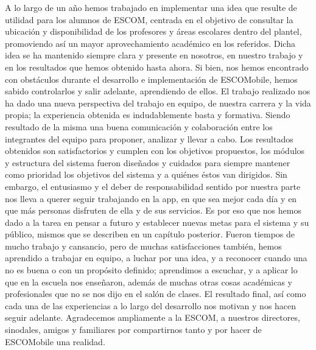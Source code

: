 \noindent
A lo largo de un año hemos trabajado en implementar una idea que resulte de utilidad para los alumnos de ESCOM, centrada en el objetivo de consultar la ubicación y disponibilidad de los profesores y áreas escolares dentro del plantel, promoviendo así un mayor aprovechamiento académico en los referidos. Dicha idea se ha mantenido siempre clara y presente en nosotros, en nuestro trabajo y en los resultados que hemos obtenido hasta ahora. Si bien, nos hemos encontrado con obstáculos durante el desarrollo e implementación de ESCOMobile, hemos sabido controlarlos y salir adelante, aprendiendo de ellos. El trabajo realizado nos ha dado una nueva perspectiva del trabajo en equipo, de nuestra carrera y la vida propia; la experiencia obtenida es indudablemente basta y formativa. Siendo resultado de la misma una buena comunicación y colaboración entre los integrantes del equipo para proponer, analizar y llevar a cabo. 
\newline
\newline
Los resultados obtenidos son satisfactorios y cumplen con los objetivos propuestos, los módulos y estructura del sistema fueron diseñados y cuidados para siempre mantener como prioridad los objetivos del sistema y a quiénes éstos van dirigidos. Sin embargo, el entusiasmo y el deber de responsabilidad sentido por nuestra parte nos lleva a querer seguir trabajando en la app, en que sea mejor cada día y en que más personas disfruten de ella y de sus servicios. Es por eso que nos hemos dado a la tarea en pensar a futuro y establecer nuevas metas para el sistema y su público, mismos que se describen en un capítulo posterior. 
\newline
\newline
Fueron tiempos de mucho trabajo y cansancio, pero de muchas satisfacciones también, hemos aprendido a trabajar en equipo, a luchar por una idea, y a reconocer cuando una no es buena o con un propósito definido; aprendimos a escuchar, y a aplicar lo que en la escuela nos enseñaron, además de muchas otras cosas académicas y profesionales que no se nos dijo en el salón de clases. El resultado final, así como cada una de las experiencias a lo largo del desarrollo nos motivan y nos hacen seguir adelante. 
\newline
Agradecemos ampliamente a la ESCOM, a nuestros directores, sinodales, amigos y familiares por compartirnos tanto y por hacer de ESCOMobile una realidad. 
